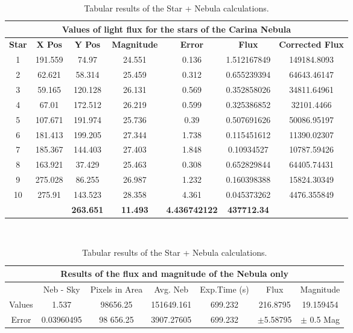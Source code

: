 \documentclass[12pt]{article}
\begin{document}
\begin{table}[H]
\begin{center}
 \footnotesize
 \begin{tabular}{|c|c|c|c||c||c|c|}
 \hline
 \multicolumn{7}{|c|}{Values of light flux for the stars of the Carina Nebula} \\
 \hline
 \textbf{Star} & \textbf{X Pos} & \textbf{Y Pos} & \textbf{Magnitude} & \textbf{Error} & \textbf{Flux} & \textbf{Corrected Flux}\\
 \hline \hline
 1&191.559 & 74.97&24.551	&0.136	&	1.512167849	&149184.8093 \\
 \hline
 2&62.621&	58.314&	25.459&	0.312	&	0.655239394	&64643.46147 \\
 \hline
 3&59.165&	120.128&	26.131&	0.569	&	0.352858026	&34811.64961 \\
 \hline
 4&67.01&	172.512&	26.219&	0.599	&	0.325386852	&32101.4466 \\
 \hline
 5&107.671&	191.974&	25.736&	0.39	&	0.507691626	&50086.95197 \\ 
 \hline
 6&181.413&	199.205&	27.344&	1.738	&	0.115451612	&11390.02307\\ 
 \hline
 7&185.367&	144.403&	27.403&	1.848	&	0.10934527	&10787.59426 \\
 \hline
 8&163.921&	37.429&	25.463&	0.308	&	0.652829844	&64405.74431 \\
 \hline
 9&275.028&	86.255&	26.987&	1.232	&	0.160398388	&15824.30349 \\ 
 \hline
 10&275.91&	143.523&	28.358&	4.361	&	0.045373262	&4476.355849 \\
 \hline \hline
 & & \textbf{263.651}	& \textbf {11.493}	& 	\textbf{4.436742122}	& \textbf{437712.34} \\
 \hline
 \end{tabular} \\ [0.5cm]
 \begin{tabular}{|c||c|c|c|c|c||c|}
 \hline
 \multicolumn{7}{|c|}{Results of the flux and magnitude of the Nebula only} \\
 \hline \hline
   & Neb - Sky & Pixels in Area & Avg. Neb & Exp.Time (s) & Flux & Magnitude \\ 
 \hline
 Values & 1.537 & 98656.25 & 151649.161 & 699.232 & 216.8795 & 19.159454 \\
 \hline
 Error & 0.03960495 & 98 656.25 & 3907.27605 & 699.232 & $\pm$5.58795 & $\pm$ 0.5 Mag \\ 
 \hline
 \end{tabular} \\ 
 \caption{Tabular results of the Star + Nebula calculations.}
 \label{CN-Stars Data}
\end{center}
\end{table} 
\end{document}
